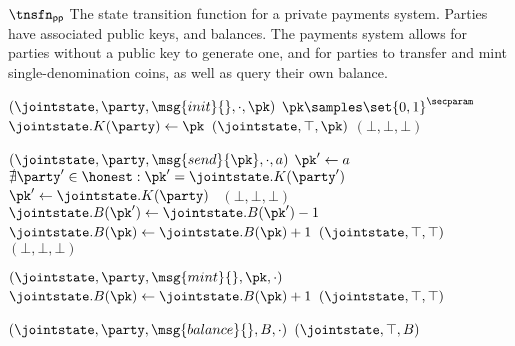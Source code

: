 \begin{transitionfn}{$\tnsfn_{\mathsf{pp}}$}
  The state transition function for a private payments system. Parties have
  associated public keys, and balances. The payments system allows for parties
  without a public key to generate one, and for parties to transfer and mint
  single-denomination coins, as well as query their own balance.

  \begin{statedecl}
  \end{statedecl}

  \begin{receiveinput*}{$(\jointstate, \party, \msg{init}{}, \cdot, \pk)$}
        \State \Let $\pk \samples \set{0,1}^\secparam$
      \EndWhile
      \State \Let $\jointstate.K(\party) \gets \pk$
      \State \Return $(\jointstate, \top, \pk)$
    \Else
      \State \Return $(\bot, \bot, \bot)$
    \EndIf
  \end{receiveinput*}

  \begin{receiveinput*}{$(\jointstate, \party, \msg{send}{\pk}, \cdot, a)$}
      \State \Let $\pk' \gets a$
      \State \Assert $\nexists \party' \in \honest : \pk' = \jointstate.K(\party')$
      \Let $\pk' \gets \jointstate.K(\party)$
    \Else
      ~\Return $(\bot, \bot, \bot)$
    \EndIf
      \State \Let $\jointstate.B(\pk') \gets \jointstate.B(\pk') - 1$
      \State \Let $\jointstate.B(\pk) \gets \jointstate.B(\pk) + 1$
      \State \Return $(\jointstate, \top, \top)$
    \Else
      ~\Return $(\bot, \bot, \bot)$
    \EndIf
  \end{receiveinput*}

  \begin{receiveinput*}{$(\jointstate, \party, \msg{mint}{}, \pk, \cdot)$}
    \State \Let $\jointstate.B(\pk) \gets \jointstate.B(\pk) + 1$
    \State \Return $(\jointstate, \top, \top)$
  \end{receiveinput*}

  \begin{receiveinput*}{$(\jointstate, \party, \msg{balance}{}, B, \cdot)$}
    \State \Return $(\jointstate, \top, B)$
  \end{receiveinput*}
\end{transitionfn}
